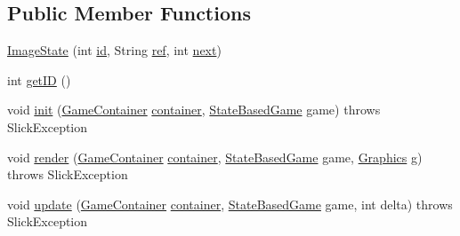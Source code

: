 \subsection*{Public Member Functions}
\begin{DoxyCompactItemize}
\item 
\mbox{\hyperlink{classorg_1_1newdawn_1_1slick_1_1tests_1_1_transition_test_1_1_image_state_ac1f4535c06d2b734e1edbe3ce6635304}{Image\+State}} (int \mbox{\hyperlink{classorg_1_1newdawn_1_1slick_1_1tests_1_1_transition_test_1_1_image_state_a4160846ad41a9f74b96e40e7f4a15237}{id}}, String \mbox{\hyperlink{classorg_1_1newdawn_1_1slick_1_1tests_1_1_transition_test_1_1_image_state_a8aa86f789ef4cf8dbcd93a9de42d0e1c}{ref}}, int \mbox{\hyperlink{classorg_1_1newdawn_1_1slick_1_1tests_1_1_transition_test_1_1_image_state_a91322399fc4bdbdba33cfe81524adb59}{next}})
\item 
int \mbox{\hyperlink{classorg_1_1newdawn_1_1slick_1_1tests_1_1_transition_test_1_1_image_state_a1c34b3d7fa12b658f0d2b1a45cbb5c15}{get\+ID}} ()
\item 
void \mbox{\hyperlink{classorg_1_1newdawn_1_1slick_1_1tests_1_1_transition_test_1_1_image_state_a34a3137ea1f75dbcb0ebfa2ee40bb13f}{init}} (\mbox{\hyperlink{classorg_1_1newdawn_1_1slick_1_1_game_container}{Game\+Container}} \mbox{\hyperlink{classorg_1_1newdawn_1_1slick_1_1state_1_1_state_based_game_a538846600436175cbed48450adfdd025}{container}}, \mbox{\hyperlink{classorg_1_1newdawn_1_1slick_1_1state_1_1_state_based_game}{State\+Based\+Game}} game)  throws Slick\+Exception 
\item 
void \mbox{\hyperlink{classorg_1_1newdawn_1_1slick_1_1tests_1_1_transition_test_1_1_image_state_a618c4ccf2c0b81b9f7d1bf75f94d7325}{render}} (\mbox{\hyperlink{classorg_1_1newdawn_1_1slick_1_1_game_container}{Game\+Container}} \mbox{\hyperlink{classorg_1_1newdawn_1_1slick_1_1state_1_1_state_based_game_a538846600436175cbed48450adfdd025}{container}}, \mbox{\hyperlink{classorg_1_1newdawn_1_1slick_1_1state_1_1_state_based_game}{State\+Based\+Game}} game, \mbox{\hyperlink{classorg_1_1newdawn_1_1slick_1_1_graphics}{Graphics}} g)  throws Slick\+Exception 
\item 
void \mbox{\hyperlink{classorg_1_1newdawn_1_1slick_1_1tests_1_1_transition_test_1_1_image_state_ab1aa849ffc7219c30355b5f1707f2465}{update}} (\mbox{\hyperlink{classorg_1_1newdawn_1_1slick_1_1_game_container}{Game\+Container}} \mbox{\hyperlink{classorg_1_1newdawn_1_1slick_1_1state_1_1_state_based_game_a538846600436175cbed48450adfdd025}{container}}, \mbox{\hyperlink{classorg_1_1newdawn_1_1slick_1_1state_1_1_state_based_game}{State\+Based\+Game}} game, int delta)  throws Slick\+Exception 
\end{DoxyCompactItemize}
